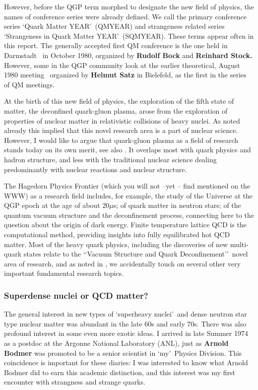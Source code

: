 However, before the QGP term morphed to designate the new field of physics, the names of conference series were already defined. We call the primary conference series \lq Quark Matter YEAR\rq\ (QM\;YEAR) and strangeness related series \lq Strangeness in Quark Matter YEAR\rq\ (SQM\;YEAR). These terms appear often in this report. The generally accepted first QM conference is the one held in Darmstadt~\cite{Bock:1980GSI} in October 1980, organized by \textbf{Rudolf Bock} and \textbf{Reinhard Stock.} However, some in the QGP community look at the earlier theoretical, August 1980 meeting~\cite{Satz:1980Bil} organized by \textbf{Helmut Satz} in Bielefeld, as the first in the series of QM meetings. 

At the birth of this new field of physics, the exploration of the fifth state of matter, the deconfined quark-gluon plasma, arose from the exploration of properties of nuclear matter in relativistic collisions of heavy nuclei. As noted already this implied that this novel research area is a part of nuclear science. However, I would like to argue that quark-gluon plasma as a field of research stands today on its own merit, see also . It overlaps most with quark physics and hadron structure, and less with the traditional nuclear science dealing predominantly with nuclear reactions and nuclear structure. 

The Hagedorn Physics Frontier (which you will not --yet -- find mentioned on the WWW) as a research field includes, for example, the study of the Universe at the QGP epoch at the age of about 20\;$\mu$s; of quark matter in neutron stars; of the quantum vacuum structure and the deconfinement process, connecting here to the question about the origin of dark energy. Finite temperature lattice QCD is the computational method, providing insights into fully equilibrated hot QCD matter. Most of the heavy quark physics, including the discoveries of new multi-quark states relate to the \lq\lq Vacuum Structure and Quark Deconfinement\rq\rq \ novel area of research, and as noted in , we accidentally touch on several other very important fundamental research topics.


\subsubsection{Superdense nuclei or QCD matter?}\label{sssec:dense}

The general interest in new types of \lq superheavy nuclei\rq\ and dense neutron star type nuclear matter was abundant in the late 60s and early 70s. There was also profound interest in some even more exotic ideas. I arrived in late Summer 1974 as a postdoc at the Argonne National Laboratory (ANL), just as \textbf{Arnold Bodmer} was promoted to be a senior scientist in \lq my\rq\ Physics Division. This coincidence is important for these diaries: I was interested to know what Arnold Bodmer did to earn this academic distinction, and this interest was my first encounter with strangness and strange quarks.

